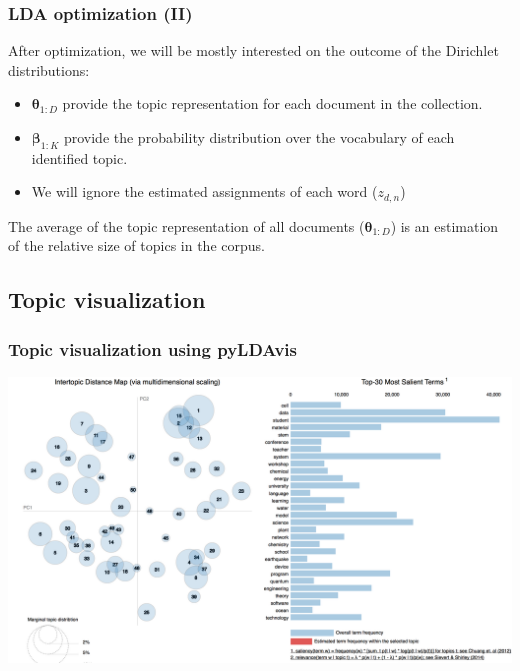 \documentclass{beamer}
\begin{document}
\begin{frame}

    \frametitle{LDA optimization (II)}

	After optimization, we will be mostly interested on the outcome of the Dirichlet distributions:
	\vspace{.5cm}
	\begin{itemize}
	\item ${\boldsymbol{\theta}}_{1:D}$ provide the topic representation for each document in the collection.
	\item ${\boldsymbol{\beta}}_{1:K}$ provide the probability distribution over the vocabulary of each identified topic.
	\item We will ignore the estimated assignments of each word ($z_{d,n}$)

	\end{itemize}
	
	\vspace{1cm}
	
	The average of the topic representation of all documents (${\boldsymbol{\theta}}_{1:D}$) is an estimation of the relative size of topics in the corpus.

\end{frame}



\subsection{Topic visualization}

\begin{frame}

    \frametitle{Topic visualization using pyLDAvis}

	\centerline{\includegraphics[width=\textwidth]{./figs/NLPTM_pyLDAvis.png}}
	
\end{frame}
\end{document}
